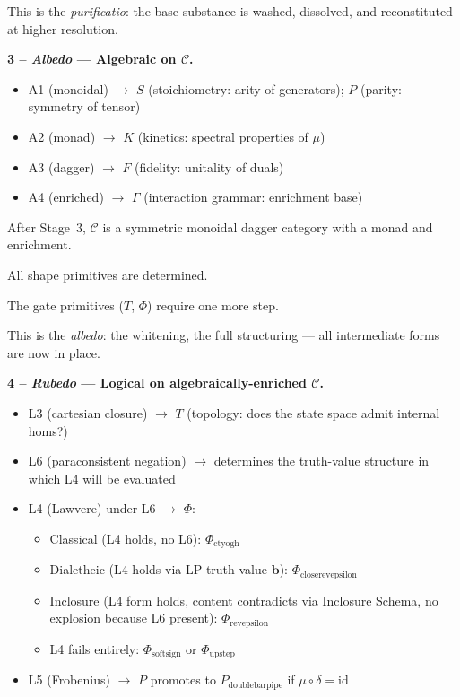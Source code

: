 \documentclass[twocolumn]{article}
\begin{document}
This is the \emph{purificatio}: the base substance is washed, dissolved, and reconstituted at higher resolution.

\medskip
\noindent\textbf{3 -- \emph{Albedo} --- Algebraic on $\mathcal{C}$.}
\begin{itemize}[nosep, leftmargin=1.5em]
  \item A1 (monoidal) $\to$ $S$ (stoichiometry: arity of generators); $P$ (parity: symmetry of tensor)
  \item A2 (monad) $\to$ $K$ (kinetics: spectral properties of $\mu$)
  \item A3 (dagger) $\to$ $F$ (fidelity: unitality of duals)
  \item A4 (enriched) $\to$ $\Gamma$ (interaction grammar: enrichment base)
\end{itemize}
After Stage~3, $\mathcal{C}$ is a symmetric monoidal dagger category with a monad and enrichment.  

All shape primitives are determined.  

The gate primitives ($T$, $\Phi$) require one more step.  

This is the \emph{albedo}: the whitening, the full structuring --- all intermediate forms are now in place.

\medskip
\noindent\textbf{4 -- \emph{Rubedo} --- Logical on algebraically-enriched $\mathcal{C}$.}
\begin{itemize}[nosep, leftmargin=1.5em]
  \item L3 (cartesian closure) $\to$ $T$ (topology: does the state space admit internal homs?)  

  \item L6 (paraconsistent negation) $\to$ determines the truth-value structure in which L4 will be evaluated  

  \item L4 (Lawvere) under L6 $\to$ $\Phi$:
  \begin{itemize}[nosep, leftmargin=1.5em]
    \item Classical (L4 holds, no L6): $\Phi_{\text{ctyogh}}$
    \item Dialetheic (L4 holds via LP truth value $\mathbf{b}$): $\Phi_{\text{closerevepsilon}}$
    \item Inclosure (L4 form holds, content contradicts via Inclosure Schema, no explosion because L6 present): $\Phi_{\text{revepsilon}}$
    \item L4 fails entirely: $\Phi_{\text{softsign}}$ or $\Phi_{\text{upstep}}$
  \end{itemize}  

  \item L5 (Frobenius) $\to$ $P$ promotes to $P_{\text{doublebarpipe}}$ if $\mu \circ \delta = \text{id}$
\end{itemize}  
\end{document}
